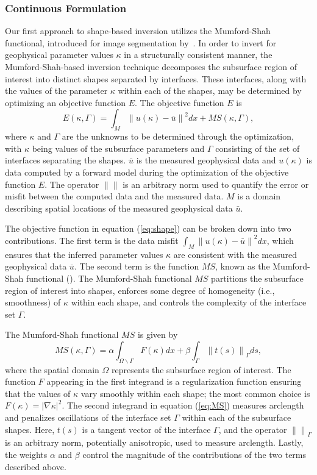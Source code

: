 \documentclass[manuscript,revised]{geophysics}
\newcommand\norm[1]{\left\lVert#1\right\rVert}
\begin{document}
\subsubsection{Continuous Formulation}
Our first approach to shape-based inversion utilizes the Mumford-Shah functional, introduced for image segmentation by~\cite{Mumford_1989}.  In order to invert for geophysical parameter values $\kappa$ in a structurally consistent manner, the Mumford-Shah-based inversion technique decomposes the subsurface region of interest into distinct shapes separated by interfaces. These interfaces, along with the values of the parameter $\kappa$ within each of the shapes, may be determined by optimizing an objective function $E$. The objective function $E$ is
\begin{equation} \label{eq:shape}
E\left(\kappa,\Gamma\right)=\int_M \norm{u(\kappa)-\bar{u}}^2  dx+MS\left(\kappa,\Gamma\right),	
\end{equation}
where $\kappa$ and $\Gamma$ are the unknowns to be determined through the optimization, with $\kappa$ being values of the subsurface parameters and $\Gamma$ consisting of the set of interfaces separating the shapes. $\bar{u}$ is the measured geophysical data and $u(\kappa)$ is data computed by a forward model during the optimization of the objective function $E$. The operator $\norm{}$  is an arbitrary norm used to quantify the error or misfit between the computed data and the measured data. $M$ is a domain describing spatial locations of the measured geophysical data $\bar{u}$. 

The objective function in equation (\ref{eq:shape}) can be broken down into two contributions.  The first term is the data misfit  $\int_M \norm{u(\kappa)-\bar{u}}^2  dx$, which ensures that the inferred parameter values $\kappa$ are consistent with the measured geophysical data $\bar{u}$.  The second term is the function $MS$, known as the Mumford-Shah functional (\cite{Mumford_1989}). The Mumford-Shah functional $MS$ partitions the subsurface region of interest into shapes, enforces some degree of homogeneity (i.e., smoothness) of $\kappa$ within each shape, and controls the complexity of the interface set $\Gamma$. 

The Mumford-Shah functional $MS$ is given by
\begin{equation} \label{eq:MS}
MS(\kappa,\Gamma)=\alpha \int_{\Omega\backslash\Gamma} F(\kappa) dx + \beta\int_\Gamma \norm{t(s)}_\Gamma  ds ,
\end{equation}
where the spatial domain $\Omega$ represents the subsurface region of interest.  The function $F$ appearing in the first integrand is a regularization function ensuring that the values of $\kappa$ vary smoothly within each shape; the most common choice is $F(\kappa)=\left\vert \nabla \kappa \right\vert^2$.   The second integrand in equation (\ref{eq:MS}) measures arclength and penalizes oscillations of the interface set $\Gamma$ within each of the subsurface shapes.  Here, $t(s)$ is a tangent vector of the interface $\Gamma$, and the operator $\norm{}_\Gamma$ is an arbitrary norm, potentially anisotropic, used to measure arclength.  Lastly, the weights $\alpha$ and $\beta$ control the magnitude of the contributions of the two terms described above.  
\end{document}
